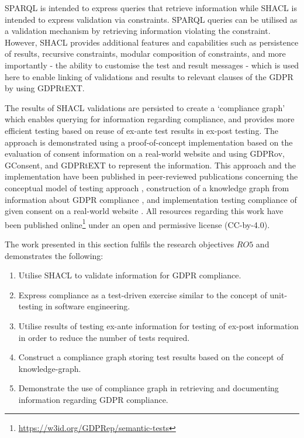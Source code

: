 SPARQL is intended to express queries that retrieve information while SHACL is intended to express validation via constraints. SPARQL queries can be utilised as a validation mechanism by retrieving information violating the constraint. 
However, SHACL provides additional features and capabilities such as persistence of results, recursive constraints, modular composition of constraints, and more importantly - the ability to customise the test and result messages - which is used here to enable linking of validations and results to relevant clauses of the GDPR by using GDPRtEXT.

The results of SHACL validations are persisted to create a `compliance graph' which enables querying for information regarding compliance, and provides more efficient testing based on reuse of ex-ante test results in ex-post testing.
The approach is demonstrated using a proof-of-concept implementation based on the evaluation of consent information on a real-world website and using GDPRov, GConsent, and GDPRtEXT to represent the information.
This approach and the implementation have been published in peer-reviewed publications concerning the conceptual model of testing approach \cite{pandit_exploring_2018}, construction of a knowledge graph from information about GDPR compliance \cite{pandit_towards_2018}, and implementation testing compliance of given consent on a real-world website \cite{pandit_test-driven_2019}.
All resources regarding this work have been published online\footnote{\url{https://w3id.org/GDPRep/semantic-tests}} under an open and permissive license (CC-by-4.0).

The work presented in this section fulfils the research objectives $RO5$ and demonstrates the following:
\begin{enumerate}
    \item Utilise SHACL to validate information for GDPR compliance.
    \item Express compliance as a test-driven exercise similar to the concept of unit-testing in software engineering.
    \item Utilise results of testing ex-ante information for testing of ex-post information in order to reduce the number of tests required.
    \item Construct a compliance graph storing test results based on the concept of knowledge-graph.
    \item Demonstrate the use of compliance graph in retrieving and documenting information regarding GDPR compliance.
\end{enumerate}

